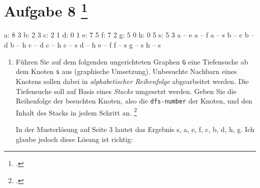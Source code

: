 \documentclass{bschlangaul-aufgabe}
\begin{document}

\section{Aufgabe 8
\footcite[Thema 1 Aufgabe 8]{examen:46115:2014:09}
}

\begin{liGraphenFormat}
a: 8 3
b: 2 3
c: 2 1
d: 0 1
e: 7 5
f: 7 2
g: 5 0
h: 0 5
s: 5 3
a -- e
a -- f
a -- s
b -- c
b -- d
b -- h
c -- d
c -- h
c -- s
d -- h
e -- f
f -- s
g -- s
h -- s
\end{liGraphenFormat}

\begin{enumerate}


\item Führen Sie auf dem folgenden ungerichteten Graphen \texttt{G} eine
Tiefensuche ab dem Knoten \texttt{s} aus (graphische Umsetzung).
Unbesuchte Nachbarn eines Knotens sollen dabei in \emph{alphabetischer
Reihenfolge} abgearbeitet werden. Die Tiefensuche soll auf Basis eines
\emph{Stacks} umgesetzt werden. Geben Sie die
Reihenfolge der besuchten Knoten, also die \texttt{dfs-number} der
Knoten, und den Inhalt des Stacks in jedem Schritt an.
\footcite[Seite 2: Tiefensuche, Breitensuche, Aufgabe 3]{aud:ab:6}

\begin{center}
\end{center}

\begin{liAntwort}
In der Musterlösung auf Seite 3 lautet das Ergebnis s, a, e, f, c, b, d, h, g.
Ich glaube jedoch diese Lösung ist richtig:


\end{liAntwort}
\end{enumerate}
\end{document}
